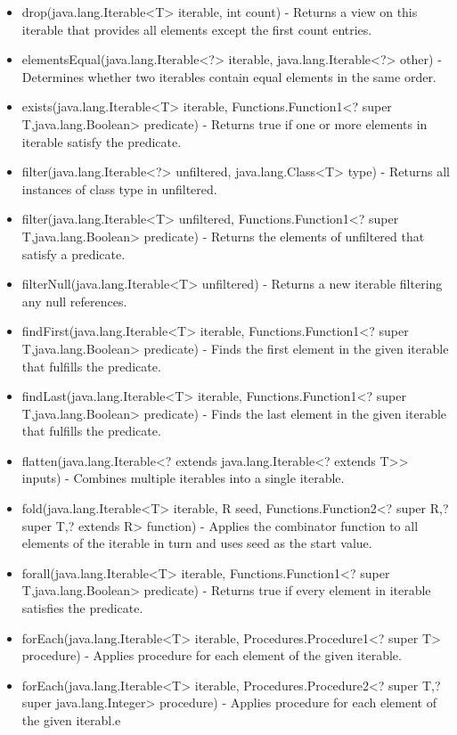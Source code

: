 \begin{itemize}
	\item drop(java.lang.Iterable<T> iterable, int count) - Returns a view on this iterable that provides all elements except the first count entries.
	\item elementsEqual(java.lang.Iterable<?> iterable, java.lang.Iterable<?> other) - Determines whether two iterables contain equal elements in the same order.
	\item exists(java.lang.Iterable<T> iterable, Functions.Function1<? super T,java.lang.Boolean> predicate) - Returns true if one or more elements in iterable satisfy the predicate.
	\item filter(java.lang.Iterable<?> unfiltered, java.lang.Class<T> type) - Returns all instances of class type in unfiltered.
	\item filter(java.lang.Iterable<T> unfiltered, Functions.Function1<? super T,java.lang.Boolean> predicate) - Returns the elements of unfiltered that satisfy a predicate.
	\item filterNull(java.lang.Iterable<T> unfiltered) - Returns a new iterable filtering any null references.
	\item findFirst(java.lang.Iterable<T> iterable, Functions.Function1<? super T,java.lang.Boolean> predicate) - Finds the first element in the given iterable that fulfills the predicate.
	\item findLast(java.lang.Iterable<T> iterable, Functions.Function1<? super T,java.lang.Boolean> predicate) - Finds the last element in the given iterable that fulfills the predicate.
	\item flatten(java.lang.Iterable<? extends java.lang.Iterable<? extends T>> inputs) - Combines multiple iterables into a single iterable.
	\item fold(java.lang.Iterable<T> iterable, R seed, Functions.Function2<? super R,? super T,? extends R> function) - Applies the combinator function to all elements of the iterable in turn and uses seed as the start value.
	\item forall(java.lang.Iterable<T> iterable, Functions.Function1<? super T,java.lang.Boolean> predicate) - Returns true if every element in iterable satisfies the predicate.
	\item forEach(java.lang.Iterable<T> iterable, Procedures.Procedure1<? super T> procedure) - Applies procedure for each element of the given iterable.
	\item forEach(java.lang.Iterable<T> iterable, Procedures.Procedure2<? super T,? super java.lang.Integer> procedure) - Applies procedure for each element of the given iterabl.e

\end{itemize}
